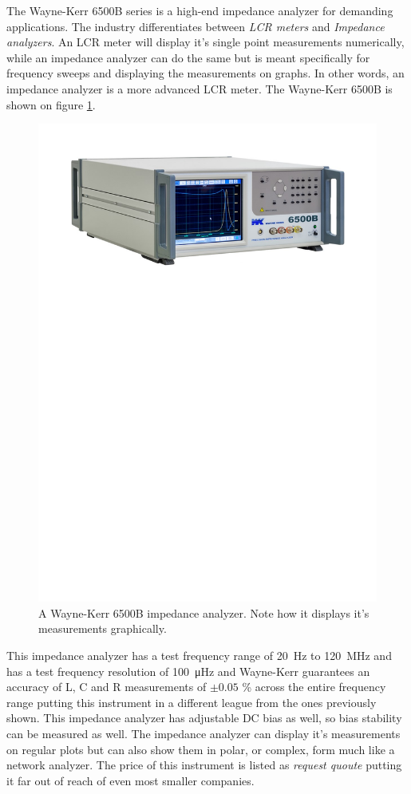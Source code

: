 The Wayne-Kerr 6500B series is a high-end impedance analyzer for demanding applications. The industry differentiates between \textit{LCR meters} and \textit{Impedance analyzers}. An LCR meter will display it's single point measurements numerically, while an impedance analyzer can do the same but is meant specifically for frequency sweeps and displaying the measurements on graphs. In other words, an impedance analyzer is a more advanced LCR meter. The Wayne-Kerr 6500B is shown on figure \ref{fig:2_2_WayneKerr6500B}. 
\begin{figure}[H]
    \centering
    \includegraphics[clip, trim=0 550 0 50, width=1\textwidth]{Sections/2_ProblemAnalysis/FIgures/WayneKerrImpedanceAnalyzer.pdf}
    \caption{A Wayne-Kerr 6500B impedance analyzer. Note how it displays it's measurements graphically.}
    \label{fig:2_2_WayneKerr6500B}
\end{figure}
This impedance analyzer has a test frequency range of \SI[]{20}{\hertz} to \SI[]{120}{\mega\hertz} and has a test frequency resolution of \SI[]{100}{\micro\hertz} and Wayne-Kerr guarantees an accuracy of L, C and R measurements of $\pm 0.05$ \% across the entire frequency range putting this instrument in a different league from the ones previously shown. This impedance analyzer has adjustable DC bias as well, so bias stability can be measured as well. The impedance analyzer can display it's measurements on regular plots but can also show them in polar, or complex, form much like a network analyzer. The price of this instrument is listed as \textit{request quoute} putting it far out of reach of even most smaller companies.


